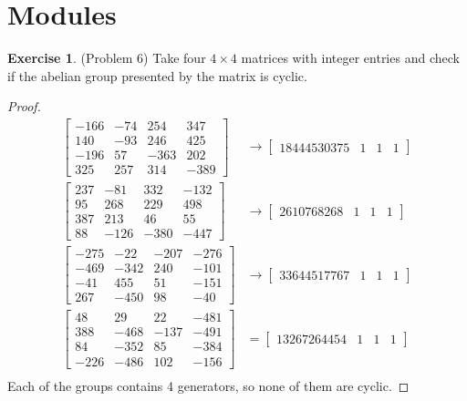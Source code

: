 \documentclass[12pt, psamsfonts]{amsart}
\theoremstyle{definition}
\newtheorem*{exer}{Exercise}
\theoremstyle{remark}
\numberwithin{equation}{section}
\begin{document}
\section{Modules}

\begin{exer}{(Problem 6)}
  Take four $4 \times 4$ matrices with integer entries and check if the abelian group presented by the matrix is cyclic.
\end{exer}

\begin{proof}
  \begin{align*}
    \begin{bmatrix} -166 & -74 & 254 & 347\\ 140 & -93 & 246 & 425\\ -196 & 57 & -363 & 202\\ 325 & 257 & 314 & -389 \end{bmatrix}
      &\rightarrow \begin{bmatrix} 18444530375 & 1 & 1 & 1 \end{bmatrix} \\
    \begin{bmatrix} 237 & -81 & 332 & -132\\ 95 & 268 & 229 & 498\\ 387 & 213 & 46 & 55\\ 88 & -126 & -380 & -447 \end{bmatrix}
      &\rightarrow \begin{bmatrix} 2610768268 & 1 & 1 & 1 \end{bmatrix} \\
    \begin{bmatrix} -275 & -22 & -207 & -276\\ -469 & -342 & 240 & -101\\ -41 & 455 & 51 & -151\\ 267 & -450 & 98 & -40 \end{bmatrix}
      &\rightarrow \begin{bmatrix} 33644517767 & 1 & 1 & 1 \end{bmatrix} \\
    \begin{bmatrix} 48 & 29 & 22 & -481\\ 388 & -468 & -137 & -491\\ 84 & -352 & 85 & -384\\ -226 & -486 & 102 & -156 \end{bmatrix}
       &= \begin{bmatrix} 13267264454 & 1 & 1 & 1 \end{bmatrix} \\
  \end{align*}
  Each of the groups contains 4 generators, so none of them are cyclic.
\end{proof}
\end{document}
